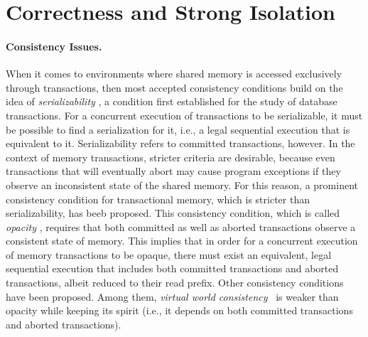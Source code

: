 \documentclass[runningheads,a4paper]{llncs}
\begin{document}
\section{Correctness and Strong Isolation}
\label{sec:badthings}

\paragraph{Consistency Issues.}
When it comes  to environments where shared memory  is accessed exclusively
through transactions, then most accepted  
consistency   conditions    build   on   the idea of   {\it serializability}
\cite{P79}, a condition first  
established  for  the study  of  database  transactions.  For a  concurrent
execution of transactions to be serializable, it must be  
possible to find a serialization for it, i.e., a legal sequential execution
that is equivalent to it.  Serializability refers to committed  
transactions,  however. In  the  context of  memory transactions,  stricter
criteria are desirable, because even transactions that  
will  eventually abort  may cause  program  exceptions if  they observe  an
inconsistent state of the shared memory.  For this  
reason, a  prominent consistency condition for  transactional memory, which
is stricter than serializability,  has beeb proposed. 
This  consistency condition, which is called {\it opacity}
\cite{guerraoui08},  requires   that  both
committed as well as aborted transactions  
observe a  consistent state  of memory.  This implies that  in order  for a
concurrent execution of memory transactions to be  
opaque,  there must exist  an equivalent,  legal sequential  execution that
includes both committed transactions and aborted  
transactions, albeit reduced to their read prefix.  Other consistency conditions 
have been proposed. Among them, 
{\it virtual world consistency}~\cite{IR09} is weaker than 
opacity while keeping its spirit (i.e., it depends on both committed 
transactions and aborted transactions). 
\end{document}

